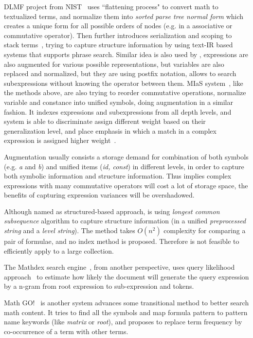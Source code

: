 DLMF project from NIST~\cite{Youssef03} uses ``flattening process" to convert math to textualized terms, and normalize them into \textit{sorted parse tree normal form} which creates a unique form for all possible orders of nodes (e.g. in a associative or commutative operator). 
Then further introduces serialization and scoping to stack terms~\cite{Youssef05}, trying to capture structure information by using text-IR based systems that supports phrase search. 
Similar idea is also used by \cite{extending08}, expressions are also augmented for various possible representations, but variables are also replaced and normalized, but they are using postfix notation, allows to search subexpressions without knowing the operator between them.  
MIaS system~\cite{mias11a,mias11,mias:thesis}, like the methods above, are also trying to reorder commutative operations, normalize variable and constance into unified symbols, doing augmentation in a similar fashion. 
It indexes expressions and subexpressions from all depth levels, and system is able to discriminate assign different weight based on their generalization level, and place emphasis in which a match in a complex expression is assigned higher weight~\cite{mias:thesis}.

Augmentation usually consists a storage demand for combination of both symbols (e.g. \textit{a} and \textit{b}) and unified items (\textit{id, const}) in different levels, in order to capture both symbolic information and structure information. Thus implies complex expressions with many commutative operators will cost a lot of storage space, the benefits of capturing expression variances will be overshadowed.

Although named as structured-based approach, \cite{not-really-struct} is using \textit{longest common subsequence} algorithm to capture structure information (in a unified \textit{preprocessed string} and a \textit{level string}). The method takes $O(n^2)$ complexity for comparing a pair of formulae, and no index method is proposed. Therefore is not feasible to efficiently apply to a large collection.

The Mathdex search engine~\cite{queryf_datan07}, from another perspective, uses query likelihood approach~\cite{iir} to estimate how likely the document will generate the query expression by a n-gram from root expression to sub-expression and tokens.

Math GO!~\cite{Adeel_mathgo} is another system advances some transitional method to better search math content. It tries to find all the symbols and map formula pattern to pattern name keywords (like \textit{matrix} or \textit{root}), and proposes to replace term frequency by co-occurrence of a term with other terms.

